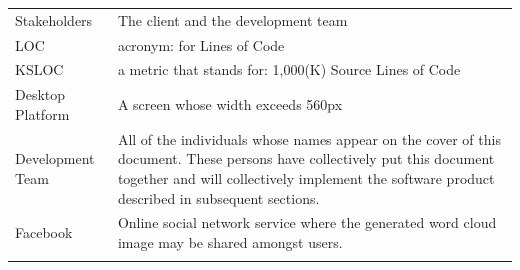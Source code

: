 \documentclass[]{article}
\begin{document}
\begin{longtable}[c]{@{}ll@{}}
\begin{minipage}[t]{0.47\columnwidth}\raggedright
Stakeholders
\end{minipage} & \begin{minipage}[t]{0.47\columnwidth}\raggedright
The client and the development team
\end{minipage}
\\\addlinespace
\begin{minipage}[t]{0.47\columnwidth}\raggedright
LOC
\end{minipage} & \begin{minipage}[t]{0.47\columnwidth}\raggedright
acronym: for Lines of Code
\end{minipage}
\\\addlinespace
\begin{minipage}[t]{0.47\columnwidth}\raggedright
KSLOC
\end{minipage} & \begin{minipage}[t]{0.47\columnwidth}\raggedright
a metric that stands for: 1,000(K) Source Lines of Code
\end{minipage}
\\\addlinespace
\begin{minipage}[t]{0.47\columnwidth}\raggedright
Desktop Platform
\end{minipage} & \begin{minipage}[t]{0.47\columnwidth}\raggedright
A screen whose width exceeds 560px
\end{minipage}
\\\addlinespace
\begin{minipage}[t]{0.47\columnwidth}\raggedright
Development Team
\end{minipage} & \begin{minipage}[t]{0.47\columnwidth}\raggedright
All of the individuals whose names appear on the cover of this document.
These persons have collectively put this document together and will
collectively implement the software product described in subsequent
sections.
\end{minipage}
\\\addlinespace
\begin{minipage}[t]{0.47\columnwidth}\raggedright
Facebook
\end{minipage} & \begin{minipage}[t]{0.47\columnwidth}\raggedright
Online social network service where the generated word cloud image may
be shared amongst users.
\end{minipage}
\\\addlinespace

\end{longtable}
\end{document}
